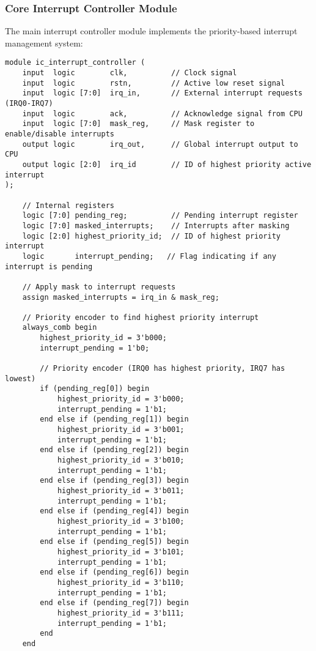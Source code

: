 \documentclass[12pt,a4paper]{article}
\begin{document}
\subsubsection{Core Interrupt Controller Module}
The main interrupt controller module implements the priority-based interrupt management system:

\begin{lstlisting}[caption=Interrupt Controller Core Module, label=lst:ic_core]
module ic_interrupt_controller (
    input  logic        clk,          // Clock signal
    input  logic        rstn,         // Active low reset signal
    input  logic [7:0]  irq_in,       // External interrupt requests (IRQ0-IRQ7)
    input  logic        ack,          // Acknowledge signal from CPU
    input  logic [7:0]  mask_reg,     // Mask register to enable/disable interrupts
    output logic        irq_out,      // Global interrupt output to CPU
    output logic [2:0]  irq_id        // ID of highest priority active interrupt
);

    // Internal registers
    logic [7:0] pending_reg;          // Pending interrupt register
    logic [7:0] masked_interrupts;    // Interrupts after masking
    logic [2:0] highest_priority_id;  // ID of highest priority interrupt
    logic       interrupt_pending;   // Flag indicating if any interrupt is pending

    // Apply mask to interrupt requests
    assign masked_interrupts = irq_in & mask_reg;

    // Priority encoder to find highest priority interrupt
    always_comb begin
        highest_priority_id = 3'b000;
        interrupt_pending = 1'b0;
        
        // Priority encoder (IRQ0 has highest priority, IRQ7 has lowest)
        if (pending_reg[0]) begin
            highest_priority_id = 3'b000;
            interrupt_pending = 1'b1;
        end else if (pending_reg[1]) begin
            highest_priority_id = 3'b001;
            interrupt_pending = 1'b1;
        end else if (pending_reg[2]) begin
            highest_priority_id = 3'b010;
            interrupt_pending = 1'b1;
        end else if (pending_reg[3]) begin
            highest_priority_id = 3'b011;
            interrupt_pending = 1'b1;
        end else if (pending_reg[4]) begin
            highest_priority_id = 3'b100;
            interrupt_pending = 1'b1;
        end else if (pending_reg[5]) begin
            highest_priority_id = 3'b101;
            interrupt_pending = 1'b1;
        end else if (pending_reg[6]) begin
            highest_priority_id = 3'b110;
            interrupt_pending = 1'b1;
        end else if (pending_reg[7]) begin
            highest_priority_id = 3'b111;
            interrupt_pending = 1'b1;
        end
    end


\end{lstlisting}
\end{document}

